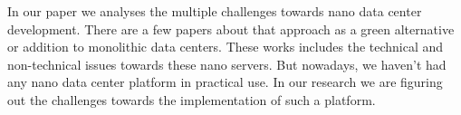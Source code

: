 

In our paper we analyses the multiple challenges towards nano data center development. There are a few papers about that approach as a  green alternative or addition to monolithic data centers. These works includes the technical and non-technical issues towards these nano servers. But nowadays, we haven't had any nano data center platform in practical use. In our research we are figuring out the challenges towards the implementation of such a platform.